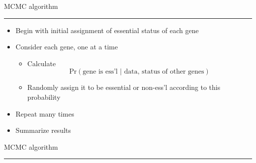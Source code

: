 \documentclass[12pt]{article}
\newcommand{\headsize}{\fontsize{35}{35} \selectfont}
\newcommand{\textsize}{\fontsize{30}{35} \selectfont}
\newcommand{\smallsize}{\fontsize{25}{30} \selectfont}
\newcommand{\smallersize}{\fontsize{20}{25} \selectfont}
\newcommand{\headcolor}{\color [cmyk]{0.72,0.67,0.33,0}}
\newcommand{\linecolor}{\color [named]{Thistle}}
\begin{document}
\newpage

\headsize \headcolor
\centerline{MCMC algorithm}
\linecolor \noindent \rule[3mm]{10in}{2mm}

\normalcolor \textsize 

\begin{minipage}[t]{6.5in}
\vspace*{0mm}

\begin{itemize} 
\smallsize
\setlength{\rightskip}{0pt plus 1fil} %
\setlength{\itemsep}{15pt}

\item Begin with initial assignment of essential status of each gene
\item Consider each gene, one at a time

\begin{itemize}
\item Calculate 
{\smallersize \headcolor $$\text{Pr}(\text{gene is ess'l } | \text{ data, status of other genes})$$}

\vspace{-12mm}
\item Randomly assign it to be essential or non-ess'l according to this
probability
\end{itemize}


\item Repeat many times

\item Summarize results

\end{itemize} 
\end{minipage}

\newpage

\headsize \headcolor
\centerline{MCMC algorithm}
\linecolor \noindent \rule[3mm]{10in}{2mm}

\normalcolor \textsize 
\end{document}
